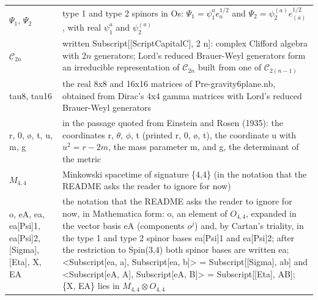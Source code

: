 \documentclass[10pt]{article}
\begin{document}
{\begin{longtable}{>{\raggedright\arraybackslash}p{}>{\raggedright\arraybackslash}p{}}
$\Psi_1$, $\Psi_2$ & type 1 and type 2 spinors in Os: $\Psi_1 = \psi_1^ae^{1/2}_a$ and $\Psi_2 = \psi_2^{(a)}e^{1/2}_{(a)}$, with real $\psi_1^a$ and $\psi_2^{(a)}$ \\
$\mathcal C_{2n}$ & written Subscript[[ScriptCapitalC], 2 n]: complex Clifford algebra with $2n$ generators; Lord's reduced Brauer-Weyl generators form an irreducible representation of $\mathcal C_{2n}$ built from one of $\mathcal C_{2(n-1)}$ \\
tau8, tau16 & the real 8x8 and 16x16 matrices of Pre-gravity6plane.nb, obtained from Dirac's 4x4 gamma matrices with Lord's reduced Brauer-Weyl generators \\
r, 0, {\o}, t, u, m, g & in the passage quoted from Einstein and Rosen (1935): the coordinates r, $\theta$, $\phi$, t (printed r, 0, {\o}, t), the coordinate u with $u^2 = r - 2m$, the mass parameter m, and g, the determinant of the metric \\
$M_{4,4}$ & Minkowski spacetime of signature \{4,4\} (in the notation that the README asks the reader to ignore for now) \\
o, eA, ea, ea[Psi]1, ea[Psi]2, [Sigma], [Eta], X, EA & the notation that the README asks the reader to ignore for now, in Mathematica form: o, an element of $O_{4,4}$, expanded in the vector basis eA (components $o^j$) and, by Cartan's triality, in the type 1 and type 2 spinor bases ea[Psi]1 and ea[Psi]2; after the restriction to Spin(3,4) both spinor bases are written ea; \textless{}Subscript[ea, a], Subscript[ea, b]\textgreater{} = Subscript[[Sigma], ab] and \textless{}Subscript[eA, A], Subscript[eA, B]\textgreater{} = Subscript[[Eta], AB]; \{X, EA\} lies in $M_{4,4}\otimes O_{4,4}$ \\
\end{longtable}}
\end{document}
